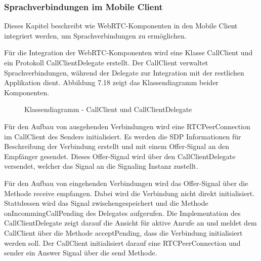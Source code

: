 \subsubsection{Sprachverbindungen im Mobile Client}

Dieses Kapitel beschreibt wie WebRTC-Komponenten in den Mobile Client integriert werden, um Sprachverbindungen zu ermöglichen.

Für die Integration der WebRTC-Komponenten wird eine Klasse CallClient und ein Protokoll CallClientDelegate erstellt.
Der CallClient verwaltet Sprachverbindungen, während der Delegate zur Integration mit der restlichen Applikation dient.
Abbildung 7.18 zeigt das Klassendiagramm beider Komponenten.

\begin{figure}[h]
    \centering
    \begin{minipage}[b]{0.6\textwidth}
        \caption{Klassendiagramm - CallClient und CallClientDelegate}
    \end{minipage}
\end{figure}

Für den Aufbau von ausgehenden Verbindungen wird eine RTCPeerConnection im CallClient des Senders initialisiert.
Es werden die SDP Informationen für Beschreibung der Verbindung erstellt und mit einem Offer-Signal an den Empfänger gesendet.
Dieses Offer-Signal wird über den CallClientDelegate versendet, welcher das Signal an die Signaling Instanz zustellt.

Für den Aufbau von eingehenden Verbindungen wird das Offer-Signal über die Methode receive empfangen.
Dabei wird die Verbindung nicht direkt initialisiert.
Stattdessen wird das Signal zwischengespeichert und die Methode onIncommingCallPending des Delegates aufgerufen.
Die Implementation des CallClientDelegate zeigt darauf die Ansicht für aktive Anrufe an und meldet dem CallClient über die Methode acceptPending, dass die Verbindung initialisiert werden soll.
Der CallClient initialisiert darauf eine RTCPeerConnection und sender ein Answer Signal über die send Methode.

